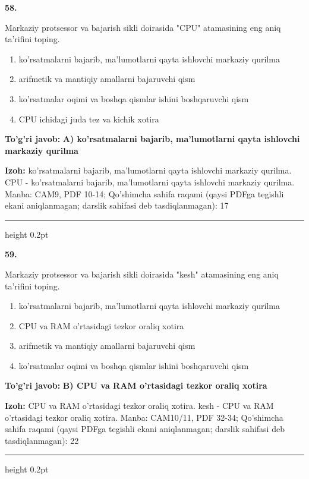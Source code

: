 \documentclass[10pt,a4paper]{article}
\begin{document}
{\bfseries\sffamily\color{ink} 58.}
\par
Markaziy protsessor va bajarish sikli doirasida "CPU" atamasining eng aniq ta'rifini toping.
\begin{enumerate}[label=\Alph*),leftmargin=9mm]
\item ko'rsatmalarni bajarib, ma'lumotlarni qayta ishlovchi markaziy qurilma
\item arifmetik va mantiqiy amallarni bajaruvchi qism
\item ko'rsatmalar oqimi va boshqa qismlar ishini boshqaruvchi qism
\item CPU ichidagi juda tez va kichik xotira
\end{enumerate}
\begin{tcolorbox}[enhanced,breakable,colback=teal!4,colframe=teal!60!black,boxrule=0.45pt,arc=1.2mm,left=2.7mm,right=2.7mm,top=1.8mm,bottom=1.8mm,before skip=2mm,after skip=2mm]
{\bfseries\sffamily\color{teal}To'g'ri javob:} \textbf{A) ko'rsatmalarni bajarib, ma'lumotlarni qayta ishlovchi markaziy qurilma}
\par\smallskip
{\bfseries Izoh:} ko'rsatmalarni bajarib, ma'lumotlarni qayta ishlovchi markaziy qurilma. CPU - ko'rsatmalarni bajarib, ma'lumotlarni qayta ishlovchi markaziy qurilma. Manba: CAM9, PDF 10-14; Qo'shimcha sahifa raqami (qaysi PDFga tegishli ekani aniqlanmagan; darslik sahifasi deb tasdiqlanmagan): 17
\end{tcolorbox}
\vspace{2mm}\hrule height 0.2pt\vspace{3mm}

{\bfseries\sffamily\color{ink} 59.}
\par
Markaziy protsessor va bajarish sikli doirasida "kesh" atamasining eng aniq ta'rifini toping.
\begin{enumerate}[label=\Alph*),leftmargin=9mm]
\item ko'rsatmalarni bajarib, ma'lumotlarni qayta ishlovchi markaziy qurilma
\item CPU va RAM o'rtasidagi tezkor oraliq xotira
\item arifmetik va mantiqiy amallarni bajaruvchi qism
\item ko'rsatmalar oqimi va boshqa qismlar ishini boshqaruvchi qism
\end{enumerate}
\begin{tcolorbox}[enhanced,breakable,colback=teal!4,colframe=teal!60!black,boxrule=0.45pt,arc=1.2mm,left=2.7mm,right=2.7mm,top=1.8mm,bottom=1.8mm,before skip=2mm,after skip=2mm]
{\bfseries\sffamily\color{teal}To'g'ri javob:} \textbf{B) CPU va RAM o'rtasidagi tezkor oraliq xotira}
\par\smallskip
{\bfseries Izoh:} CPU va RAM o'rtasidagi tezkor oraliq xotira. kesh - CPU va RAM o'rtasidagi tezkor oraliq xotira. Manba: CAM10/11, PDF 32-34; Qo'shimcha sahifa raqami (qaysi PDFga tegishli ekani aniqlanmagan; darslik sahifasi deb tasdiqlanmagan): 22
\end{tcolorbox}
\vspace{2mm}\hrule height 0.2pt\vspace{3mm}
\end{document}
